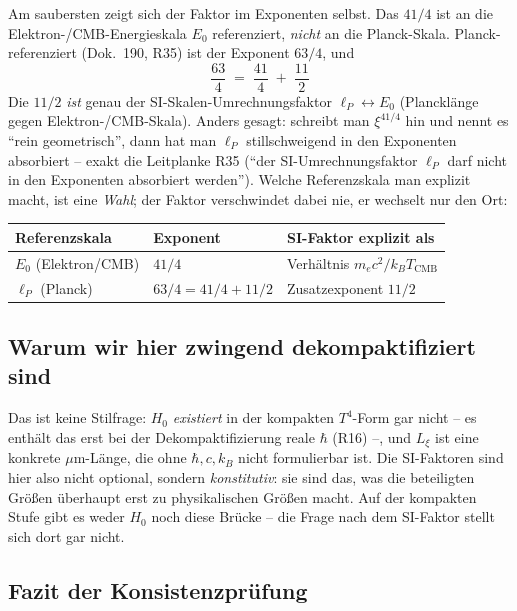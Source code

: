 Am saubersten zeigt sich der Faktor im Exponenten selbst. Das $41/4$ ist an die
Elektron-/CMB-Energieskala $E_0$ referenziert, \emph{nicht} an die Planck-Skala.
Planck-referenziert (Dok.~190, R35) ist der Exponent $63/4$, und
\begin{equation}
  \boxed{\;\frac{63}{4} \;=\; \frac{41}{4} \;+\; \frac{11}{2}\;}
  \label{eq:exp-split}
\end{equation}
Die $11/2$ \emph{ist} genau der SI-Skalen-Umrechnungsfaktor
$\ell_P \leftrightarrow E_0$ (Plancklänge gegen Elektron-/CMB-Skala). Anders
gesagt: schreibt man $\xi^{41/4}$ hin und nennt es \enquote{rein geometrisch},
dann hat man $\ell_P$ stillschweigend in den Exponenten absorbiert -- exakt die
Leitplanke R35 (\enquote{der SI-Umrechnungsfaktor $\ell_P$ darf nicht in den
Exponenten absorbiert werden}). Welche Referenzskala man explizit macht, ist
eine \emph{Wahl}; der Faktor verschwindet dabei nie, er wechselt nur den Ort:
\begin{center}
{\small
\renewcommand{\arraystretch}{1.3}
\begin{tabular}{p{4.4cm}p{4.4cm}p{4.4cm}}
\toprule
\textbf{Referenzskala} & \textbf{Exponent} & \textbf{SI-Faktor explizit als} \\
\midrule
$E_0$ (Elektron/CMB) & $41/4$ & Verhältnis $m_ec^2/k_BT_\text{CMB}$ \\
$\ell_P$ (Planck)    & $63/4 = 41/4 + 11/2$ & Zusatzexponent $11/2$ \\
\bottomrule
\end{tabular}
}
\end{center}

\subsection*{Warum wir hier zwingend dekompaktifiziert sind}

Das ist keine Stilfrage: $H_0$ \emph{existiert} in der kompakten $T^4$-Form gar
nicht -- es enthält das erst bei der Dekompaktifizierung reale $\hbar$ (R16) --,
und $L_\xi$ ist eine konkrete $\mu$m-Länge, die ohne $\hbar, c, k_B$ nicht
formulierbar ist. Die SI-Faktoren sind hier also nicht optional, sondern
\emph{konstitutiv}: sie sind das, was die beteiligten Größen überhaupt erst zu
physikalischen Größen macht. Auf der kompakten Stufe gibt es weder $H_0$ noch
diese Brücke -- die Frage nach dem SI-Faktor stellt sich dort gar nicht.

\subsection*{Fazit der Konsistenzprüfung}

